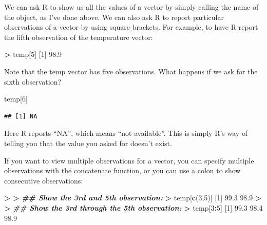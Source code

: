 \documentclass[
]{book}
\newenvironment{Shaded}{\begin{snugshade}}{\end{snugshade}}
\newcommand{\DecValTok}[1]{\textcolor[rgb]{0.00,0.00,0.81}{#1}}
\newcommand{\DocumentationTok}[1]{\textcolor[rgb]{0.56,0.35,0.01}{\textbf{\textit{#1}}}}
\newcommand{\ErrorTok}[1]{\textcolor[rgb]{0.64,0.00,0.00}{\textbf{#1}}}
\newcommand{\FloatTok}[1]{\textcolor[rgb]{0.00,0.00,0.81}{#1}}
\newcommand{\FunctionTok}[1]{\textcolor[rgb]{0.13,0.29,0.53}{\textbf{#1}}}
\newcommand{\NormalTok}[1]{#1}
\newcommand{\SpecialCharTok}[1]{\textcolor[rgb]{0.81,0.36,0.00}{\textbf{#1}}}
\begin{document}
We can ask R to show us all the values of a vector by simply calling the name of the object, as I've done above. We can also ask R to report particular observations of a vector by using square brackets. For example, to have R report the fifth observation of the temperature vector:

\begin{Shaded}
\begin{Highlighting}[]
\SpecialCharTok{\textgreater{}}\NormalTok{ temp[}\DecValTok{5}\NormalTok{]}
\NormalTok{[}\DecValTok{1}\NormalTok{] }\FloatTok{98.9}
\end{Highlighting}
\end{Shaded}

Note that the temp vector has five observations. What happens if we ask for the sixth observation?

\begin{Shaded}
\begin{Highlighting}[]
\NormalTok{temp[}\DecValTok{6}\NormalTok{]}
\end{Highlighting}
\end{Shaded}

\begin{verbatim}
## [1] NA
\end{verbatim}

Here R reports ``NA'', which means ``not available''. This is simply R's way of telling you that the value you asked for doesn't exist.

If you want to view multiple observations for a vector, you can specify multiple observations with the concatenate function, or you can use a colon to show consecutive observations:

\begin{Shaded}
\begin{Highlighting}[]
\SpecialCharTok{\textgreater{}} 
\ErrorTok{\textgreater{}} \DocumentationTok{\#\# Show the 3rd and 5th observation:}
\ErrorTok{\textgreater{}}\NormalTok{ temp[}\FunctionTok{c}\NormalTok{(}\DecValTok{3}\NormalTok{,}\DecValTok{5}\NormalTok{)]}
\NormalTok{[}\DecValTok{1}\NormalTok{] }\FloatTok{99.3} \FloatTok{98.9}
\SpecialCharTok{\textgreater{}} 
\ErrorTok{\textgreater{}} \DocumentationTok{\#\# Show the 3rd through the 5th observation:}
\ErrorTok{\textgreater{}}\NormalTok{ temp[}\DecValTok{3}\SpecialCharTok{:}\DecValTok{5}\NormalTok{]}
\NormalTok{[}\DecValTok{1}\NormalTok{] }\FloatTok{99.3} \FloatTok{98.4} \FloatTok{98.9}
\end{Highlighting}
\end{Shaded}
\end{document}
